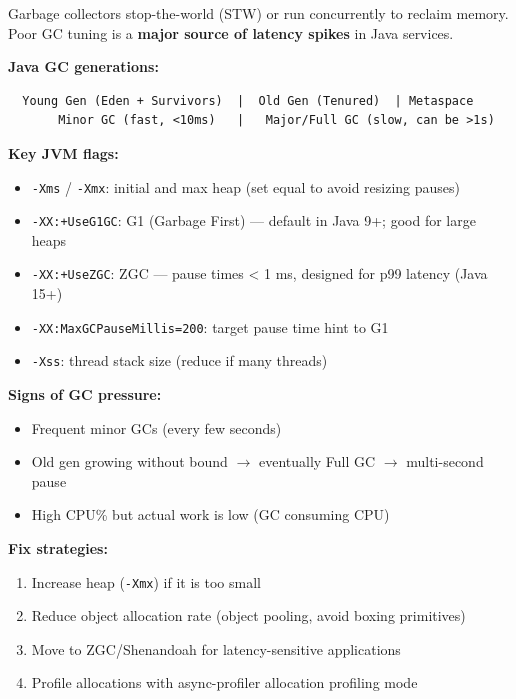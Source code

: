 \documentclass[11pt]{article}
\providecommand{\tightlist}{\setlength{\itemsep}{1pt}\setlength{\parskip}{0pt}}
\begin{document}
Garbage collectors stop-the-world (STW) or run concurrently to reclaim memory. Poor GC tuning is a \textbf{major source of latency spikes} in Java services.

\textbf{Java GC generations:}

\setcodelang{}

\begin{verbatim}
  Young Gen (Eden + Survivors)  |  Old Gen (Tenured)  | Metaspace
       Minor GC (fast, <10ms)   |   Major/Full GC (slow, can be >1s)
\end{verbatim}

\textbf{Key JVM flags:}

\begin{itemize}
\tightlist
\item
  \texttt{-Xms} / \texttt{-Xmx}: initial and max heap (set equal to avoid resizing pauses)
\item
  \texttt{-XX:+UseG1GC}: G1 (Garbage First) --- default in Java 9+; good for large heaps
\item
  \texttt{-XX:+UseZGC}: ZGC --- pause times \textless{} 1 ms, designed for p99 latency (Java 15+)
\item
  \texttt{-XX:MaxGCPauseMillis=200}: target pause time hint to G1
\item
  \texttt{-Xss}: thread stack size (reduce if many threads)
\end{itemize}

\textbf{Signs of GC pressure:}

\begin{itemize}
\tightlist
\item
  Frequent minor GCs (every few seconds)
\item
  Old gen growing without bound \(\rightarrow\) eventually Full GC \(\rightarrow\) multi-second pause
\item
  High CPU\% but actual work is low (GC consuming CPU)
\end{itemize}

\textbf{Fix strategies:}

\begin{enumerate}
\def\labelenumi{\arabic{enumi}.}
\tightlist
\item
  Increase heap (\texttt{-Xmx}) if it is too small
\item
  Reduce object allocation rate (object pooling, avoid boxing primitives)
\item
  Move to ZGC/Shenandoah for latency-sensitive applications
\item
  Profile allocations with async-profiler allocation profiling mode
\end{enumerate}
\end{document}
